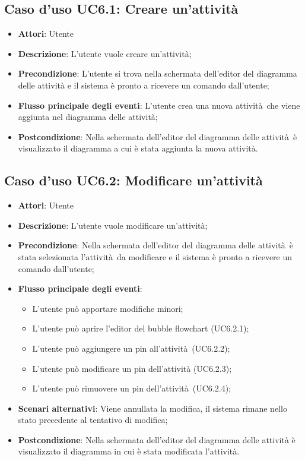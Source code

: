 \documentclass[../AnalisiDeiRequisiti.tex]{subfiles}
\begin{document}
				\subsection{Caso d'uso UC6.1: Creare un'attività}
				\begin{itemize}
					\item \textbf{Attori}: Utente
					\item \textbf{Descrizione}: L'utente vuole creare un'attività;
					\item \textbf{Precondizione}: L'utente si trova nella schermata dell'editor del diagramma delle attività e il sistema è pronto a ricevere un comando dall'utente;
					\item \textbf{Flusso principale degli eventi}: L'utente crea una nuova attività che viene aggiunta nel diagramma delle attività;
					\item \textbf{Postcondizione}: Nella schermata dell'editor del diagramma delle attività è visualizzato il diagramma a cui è stata aggiunta la nuova attività.
				\end{itemize}
				\subsection{Caso d'uso UC6.2: Modificare un'attività}
				\begin{itemize}
					\item \textbf{Attori}: Utente
					\item \textbf{Descrizione}: L'utente vuole modificare un'attività;
					\item \textbf{Precondizione}: Nella schermata dell'editor del diagramma delle attività è stata selezionata l'attività da modificare e il sistema è pronto a ricevere un comando dall'utente;
					\item \textbf{Flusso principale degli eventi}: \begin{itemize}
						\item L'utente può apportare modifiche minori;
						\item L'utente può aprire l'editor del bubble flowchart (UC6.2.1);
						\item L'utente può aggiungere un pin all'attività (UC6.2.2);
						\item L'utente può modificare un pin dell'attività (UC6.2.3);
						\item L'utente può rimuovere un pin dell'attività (UC6.2.4);
					\end{itemize}
					\item \textbf{Scenari alternativi}: Viene annullata la modifica, il sistema rimane nello stato precedente al tentativo di modifica;
					\item \textbf{Postcondizione}: Nella schermata dell'editor del diagramma delle attività è visualizzato il diagramma in cui è stata modificata l'attività.
				\end{itemize}
\end{document}
